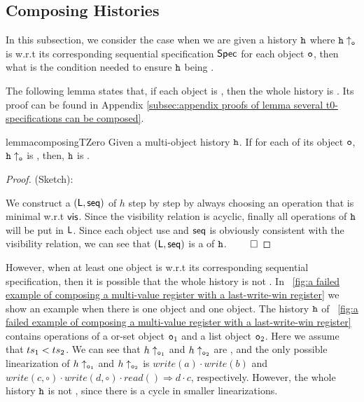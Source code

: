 \subsection{Composing Histories}
\label{lemma:composing histories}

In this subsection, we consider the case when we are given a history $\mathtt{h}$ where $\mathtt{h} \uparrow_{\mathtt{o}}$ is \crdtlinearizable{} w.r.t its corresponding sequential specification $\mathsf{Spec}{}$ for each object $\mathtt{o}$, then what is the condition needed to ensure $\mathtt{h}$ being \crdtlinearizable.

The following lemma states that, if each object is \tzerolinearizable{}, then the whole history is \crdtlinearizable{}. Its proof can be found in Appendix \ref{subsec:appendix proofs of lemma several t0-specifications can be composed}.

\begin{restatable}{lemma}{composingTZero}
\label{lemma:several t0-specifications can be composed}
Given a multi-object history $\mathtt{h}$. If for each of its object $\mathtt{o}$, $\mathtt{h} \uparrow_{\mathtt{o}}$ is \tzerolinearizable{}, then, $\mathtt{h}$ is \crdtlinearizable{}.
\end{restatable}

\begin {proof} (Sketch):

We construct a \crdtlinearization $(\mathsf{L}, \mathsf{seq})$ of $h$ step by step by always choosing an operation that is minimal w.r.t $\mathsf{vis}$. Since the visibility relation is acyclic, finally all operations of $\mathtt{h}$ will be put in $\mathsf{L}$. Since each object use \tzerolin{} and $\mathsf{seq}$ is obviously consistent with the visibility relation, we can see that $(\mathsf{L}, \mathsf{seq})$ is a \crdtlinearization of $\mathtt{h}$. $\qed$
\end {proof}


However, %
when at least one object is \tonelinearizable{} w.r.t its corresponding sequential specification, then it is possible that the whole history is not \crdtlinearizable. In \figurename~\ref{fig:a failed example of composing a multi-value register with a last-write-win register} we show an example when there is one \tonelinearizable{} object and one \tzerolinearizable{} object. The history $\mathtt{h}$ of \figurename~\ref{fig:a failed example of composing a multi-value register with a last-write-win register} contains operations of a or-set object $\mathtt{o}_1$ and a list object $\mathtt{o}_2$. Here we assume that $ts_1 < ts_2$. We can see that $h \uparrow_{\mathtt{o}_1}$ and $h \uparrow_{\mathtt{o}_2}$ are \crdtlinearizable, and the only possible linearization of $h \uparrow_{\mathtt{o}_1}$ and $h \uparrow_{\mathtt{o}_2}$ is $\mathit{write}(a) \cdot \mathit{write}(b)$ and $\mathit{write}(c,\circ) \cdot \mathit{write}(d,\circ) \cdot \mathit{read}() \Rightarrow d \cdot c$, respectively. However, the whole history $\mathtt{h}$ is not \crdtlinearizable, since there is a cycle in smaller linearizations.

